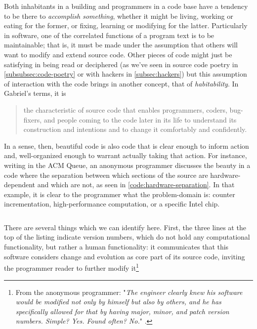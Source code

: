 Both inhabitants in a building and programmers in a code base have a tendency to be there to \emph{accomplish something}, whether it might be living, working or eating for the former, or fixing, learning or modifying for the latter. Particularly in software, one of the correlated functions of a program text is to be maintainable; that is, it must be made under the assumption that others will want to modify and extend source code. Other pieces of code might just be satisfying in being read or deciphered (as we've seen in source code poetry in \autoref{subsubsec:code-poetry} or with hackers in \autoref{subsec:hackers}) but this assumption of interaction with the code brings in another concept, that of \emph{habitability}. In Gabriel's terms, it is

\begin{quote}
    the characteristic of source code that enables programmers, coders, bug-fixers, and people coming to the code later in its life to understand its construction and intentions and to change it comfortably and confidently. \citep{gabriel_patterns_1998}
\end{quote}

In a sense, then, beautiful code is also code that is clear enough to inform action and, well-organized enough to warrant actually taking that action. For instance, writing in the ACM Queue, an anonymous programmer discusses the beauty in a code where the separation between which sections of the source are hardware-dependent and which are not, as seen in \autoref{code:hardware-separation}. In that example, it is clear to the programmer what the problem-domain is: counter incrementation, high-performance computation, or a specific Intel chip.

\begin{listing}
    \inputminted{c}{./corpus/hardware_separation.h}
    \caption{\emph{hardware\_separation.h} - This header file defines the structure of a program, both in its human use, in its interaction with hardware components, and its decoupling of hardware (mentioned in the comments) and software elements (mentioned in the \lstinline{\#define} macro and the \lstinline{pmc_mdep} struct). Additionally, the header does not contain any executable code, thus reinforcing its role as a plan rather than a full building.}
    \label{code:hardware-separation}
\end{listing}

There are several things which we can identify here. First, the three lines at the top of the listing indicate version numbers, which do not hold any computational functionality, but rather a human functionality: it communicates that this software considers change and evolution as core part of its source code, inviting the programmer reader to further modify it\footnote{From the anonymous programmer: "\emph{The engineer clearly knew his software would be modified not only by himself but also by others, and he has specifically allowed for that by having major, minor, and patch version numbers. Simple? Yes. Found often? No.}" \citep{vicious_beautiful_2008}.}

